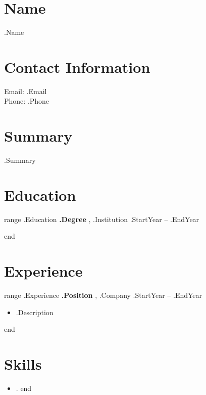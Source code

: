 \documentclass{article}
\begin{document}
\section*{Name}
{{.Name}}

\section*{Contact Information}
Email: {{.Email}} \\
Phone: {{.Phone}}

\section*{Summary}
{{.Summary}}

\section*{Education}
{{range .Education}}
\textbf{ {{.Degree}} }, {{.Institution}} \hfill {{.StartYear}} -- {{.EndYear}}

{{end}}

\section*{Experience}
{{range .Experience}}
\textbf{ {{.Position}} }, {{.Company}} \hfill {{.StartYear}} -- {{.EndYear}}
\begin{itemize}
  \item {{.Description}}
\end{itemize}
{{end}}

\section*{Skills}
\begin{itemize}
{{range .Skills}}
  \item {{.}}
{{end}}
\end{itemize}
\end{document}
